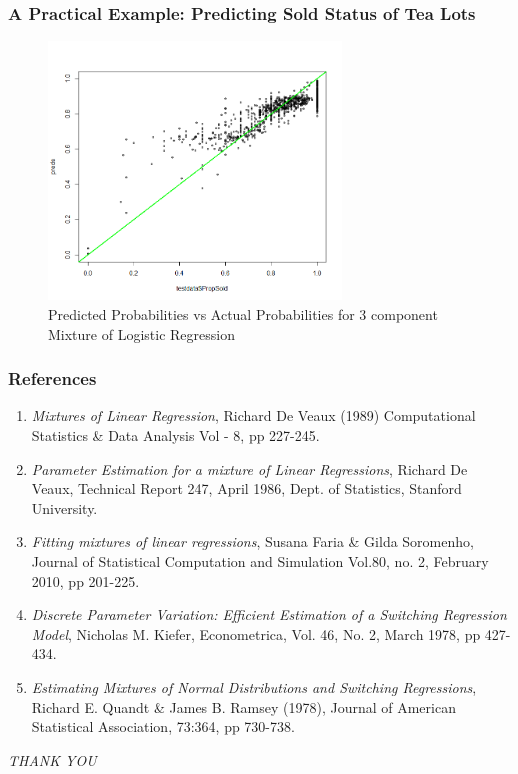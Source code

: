 \documentclass{beamer}
\begin{document}
\begin{frame}
\frametitle{A Practical Example: Predicting Sold Status of Tea Lots}
\begin{figure}
	\caption{Predicted Probabilities vs Actual Probabilities for 3 component Mixture of Logistic Regression}
	\includegraphics[height= 2.7in]{./pracplot_3.png}
\end{figure}
\end{frame}


\begin{frame}
	\frametitle{References}
	\begin{enumerate}
		\item \textit{Mixtures of Linear Regression}, Richard De Veaux (1989) Computational Statistics \& Data Analysis Vol - 8, pp 227-245.
		\item \textit{Parameter Estimation for a mixture of Linear Regressions}, Richard De Veaux, Technical Report 247, April 1986, Dept. of Statistics, Stanford University.
		\item \textit{Fitting mixtures of linear regressions}, Susana Faria \& Gilda Soromenho, Journal of Statistical Computation and Simulation Vol.80, no. 2, February 2010, pp 201-225.
		\item \textit{Discrete Parameter Variation: Efficient Estimation of a Switching Regression Model}, Nicholas M. Kiefer, Econometrica, Vol. 46, No. 2, March 1978, pp 427-434.
		\item \textit{Estimating Mixtures of Normal Distributions and
			Switching Regressions}, Richard E. Quandt \& James B. Ramsey (1978), Journal of American Statistical Association, 73:364, pp 730-738.
	\end{enumerate}
\end{frame}


\begin{frame}
	\begin{center}
		\Huge 
		\textit{THANK YOU}
	\end{center}
\end{frame}
\end{document}
